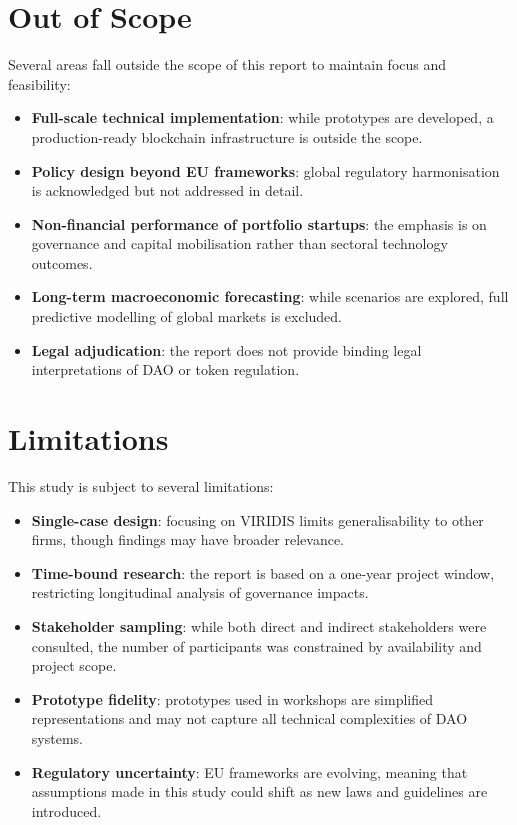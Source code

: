 \documentclass[
  english,
  12pt,
  oneside,
  open=any]{scrbook}
\providecommand{\tightlist}{%
  \setlength{\itemsep}{0pt}\setlength{\parskip}{0pt}}\usepackage{longtable,booktabs,array}
\begin{document}
\section{Out of Scope}\label{sec-out}

Several areas fall outside the scope of this report to maintain focus
and feasibility:

\begin{itemize}
\tightlist
\item
  \textbf{Full-scale technical implementation}: while prototypes are
  developed, a production-ready blockchain infrastructure is outside the
  scope.\\
\item
  \textbf{Policy design beyond EU frameworks}: global regulatory
  harmonisation is acknowledged but not addressed in detail.\\
\item
  \textbf{Non-financial performance of portfolio startups}: the emphasis
  is on governance and capital mobilisation rather than sectoral
  technology outcomes.\\
\item
  \textbf{Long-term macroeconomic forecasting}: while scenarios are
  explored, full predictive modelling of global markets is excluded.\\
\item
  \textbf{Legal adjudication}: the report does not provide binding legal
  interpretations of DAO or token regulation.
\end{itemize}

\section{Limitations}\label{sec-limits}

This study is subject to several limitations:

\begin{itemize}
\tightlist
\item
  \textbf{Single-case design}: focusing on VIRIDIS limits
  generalisability to other firms, though findings may have broader
  relevance.\\
\item
  \textbf{Time-bound research}: the report is based on a one-year
  project window, restricting longitudinal analysis of governance
  impacts.\\
\item
  \textbf{Stakeholder sampling}: while both direct and indirect
  stakeholders were consulted, the number of participants was
  constrained by availability and project scope.\\
\item
  \textbf{Prototype fidelity}: prototypes used in workshops are
  simplified representations and may not capture all technical
  complexities of DAO systems.\\
\item
  \textbf{Regulatory uncertainty}: EU frameworks are evolving, meaning
  that assumptions made in this study could shift as new laws and
  guidelines are introduced.
\end{itemize}
\end{document}
